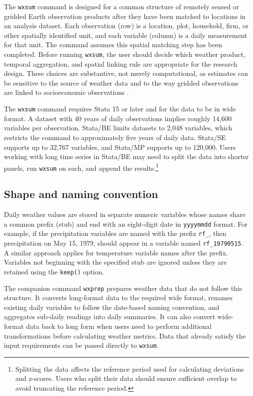 The \texttt{wxsum} command is designed for a common structure of remotely sensed or gridded Earth observation products after they have been matched to locations in an analysis dataset. Each observation (row) is a location, plot, household, firm, or other spatially identified unit, and each variable (column) is a daily measurement for that unit. The command assumes this spatial matching step has been completed. Before running \texttt{wxsum}, the user should decide which weather product, temporal aggregation, and spatial linking rule are appropriate for the research design. These choices are substantive, not merely computational, as estimates can be sensitive to the source of weather data and to the way gridded observations are linked to socioeconomic observations \citep{AuffhammerEtAl13, MichlerEtAl26}.

The \texttt{wxsum} command requires Stata 15 or later and for the data to be in wide format. A dataset with 40 years of daily observations implies roughly 14,600 variables per observation. Stata/BE limits datasets to 2,048 variables, which restricts the command to approximately five years of daily data. Stata/SE supports up to 32,767 variables, and Stata/MP supports up to 120,000. Users working with long time series in Stata/BE may need to split the data into shorter panels, run \texttt{wxsum} on each, and append the results.\footnote{Splitting the data affects the reference period used for calculating deviations and z-scores. Users who split their data should ensure sufficient overlap to avoid truncating the reference period.}

\subsection{Shape and naming convention}

Daily weather values are stored in separate numeric variables whose names share a common prefix (stub) and end with an eight-digit date in \texttt{yyyymmdd} format. For example, if the precipitation variables are named with the prefix \texttt{rf\_}, then precipitation on May 15, 1979, should appear in a variable named \texttt{rf\_19790515}. A similar approach applies for temperature variable names after the prefix. Variables not beginning with the specified stub are ignored unless they are retained using the \texttt{keep()} option.

The companion command \texttt{wxprep} prepares weather data that do not follow this structure. It converts long-format data to the required wide format, renames existing daily variables to follow the date-based naming convention, and aggregates sub-daily readings into daily summaries. It can also convert wide-format data back to long form when users need to perform additional transformations before calculating weather metrics. Data that already satisfy the input requirements can be passed directly to \texttt{wxsum}.

